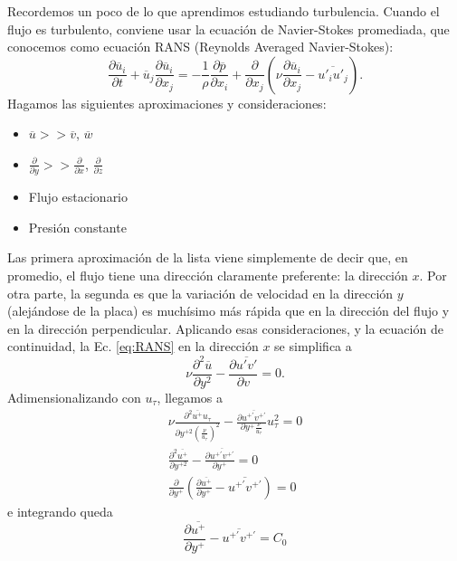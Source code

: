 Recordemos un poco de lo que aprendimos estudiando turbulencia.
Cuando el flujo es turbulento, conviene usar la ecuación de Navier-Stokes promediada, que conocemos como ecuación RANS (Reynolds Averaged Navier-Stokes):
%
\begin{equation}\label{eq:RANS}
\frac{\partial \overline{u}_i}{\partial t} + \overline{u}_j\frac{\partial \overline{u}_i}{\partial x_j}  = -\frac{1}{\rho}\frac{\partial \overline{p}}{\partial x_i} + \frac{\partial}{\partial x_j}\left(\nu \frac{\partial \overline{u}_i}{\partial x_j} - \overline{u'_iu'_j}\right).
\end{equation}
%
Hagamos las siguientes aproximaciones y consideraciones:
%
\begin{itemize}
\item $\overline{u} >> \overline{v}$, $\overline{w}$
\item $\frac{\partial}{\partial y} >> \frac{\partial}{\partial x}$, $\frac{\partial}{\partial z}$
\item Flujo estacionario
\item Presión constante
\end{itemize}
%
Las primera aproximación de la lista viene simplemente de decir que, en promedio, el flujo tiene una dirección claramente preferente: la dirección $x$.
Por otra parte, la segunda es que la variación de velocidad en la dirección $y$ (alejándose de la placa) es muchísimo más rápida que en la dirección del flujo y en la dirección perpendicular.
Aplicando esas consideraciones, y la ecuación de continuidad, la Ec. \eqref{eq:RANS} en la dirección $x$ se simplifica a 
%
\begin{equation}
\nu\frac{\partial^2 \overline{u}}{\partial y^2} - \frac{\partial \overline{u'v'}}{\partial v} = 0.
\end{equation}
%
Adimensionalizando con $u_\tau$, llegamos a
%
\begin{align}
\nu\frac{\partial^2\overline{u^+}u_\tau}{\partial y^{+2}\left(\frac{\nu}{u_\tau}\right)^2} - \frac{\partial \overline{u^{+\prime}v^{+\prime}}}{\partial y^+\frac{\nu}{u_\tau}}u_\tau^2 = 0\nonumber\\
\frac{\partial^2\overline{u^+}}{\partial y^{+2}}-\frac{\partial \overline{u^{+\prime}v^{+\prime}}}{\partial y^+} = 0\nonumber\\
\frac{\partial}{\partial y^+}\left(\frac{\partial\overline{u^+}}{\partial y^+}-\overline{u^{+\prime}v^{+\prime}}\right) = 0
\end{align}
%
e integrando queda
%
\begin{equation}\label{eq:uplus_aux}
\frac{\partial\overline{u^+}}{\partial y^+}-\overline{u^{+\prime}v^{+\prime}}= C_0
\end{equation}

